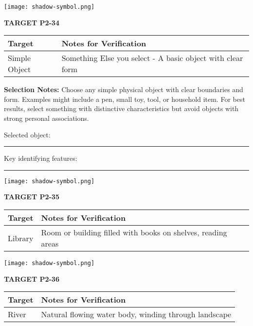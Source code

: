 \documentclass[10pt,twoside,final]{book} %
\makeatletter
\newcommand{\cleardoublepageWithSymbol}{%
  \clearpage %
  \if@twoside %
    \ifodd\c@page %
    \else %
      \thispagestyle{fancy} %
      \begingroup %
        \vspace*{0pt} %
        \vfill %
        \centering %
        \noindent 
        \texttt{[image: shadow-symbol.png]}
        \vfill %
      \endgroup
      \newpage    %
      \if@twocolumn\if@firstcolumn\else\hbox{}\newpage\fi\fi
    \fi
  \fi
}
\makeatother
\begin{document}
\cleardoublepageWithSymbol
\label{target:P2-34}
\begin{center}
\Large\textbf{TARGET P2-34}
\end{center}
\begin{mdframed}[backgroundcolor=white, linewidth=0.7pt, linecolor=rvprimary, shadow=true, shadowsize=1pt, shadowcolor=graydark!40, roundcorner=3pt]
\begin{tabular}{|p{3.5cm}|p{9cm}|}
\hline
\rowcolor{rvprimary!15}
\textbf{Target} & \textbf{Notes for Verification} \\
\hline
Simple Object & Something Else you select - A basic object with clear form \\
\hline
\end{tabular}

\vspace{0.3cm}
\textbf{Selection Notes:} Choose any simple physical object with clear boundaries and form. Examples might include a pen, small toy, tool, or household item. For best results, select something with distinctive characteristics but avoid objects with strong personal associations.

\vspace{0.2cm}
Selected object: \rule{4in}{0.4pt}

\vspace{0.2cm}
Key identifying features: \rule{4in}{0.4pt}
\end{mdframed}


\cleardoublepageWithSymbol
\label{target:P2-35}
\begin{center}
\Large\textbf{TARGET P2-35}
\end{center}
\begin{mdframed}[backgroundcolor=white, linewidth=0.7pt, linecolor=rvprimary, shadow=true, shadowsize=1pt, shadowcolor=graydark!40, roundcorner=3pt]
\begin{tabular}{|p{3.5cm}|p{9cm}|}
\hline
\rowcolor{rvprimary!15}
\textbf{Target} & \textbf{Notes for Verification} \\
\hline
Library & Room or building filled with books on shelves, reading areas \\
\hline
\end{tabular}
\end{mdframed}


\cleardoublepageWithSymbol
\label{target:P2-36}
\begin{center}
\Large\textbf{TARGET P2-36}
\end{center}
\begin{mdframed}[backgroundcolor=white, linewidth=0.7pt, linecolor=rvprimary, shadow=true, shadowsize=1pt, shadowcolor=graydark!40, roundcorner=3pt]
\begin{tabular}{|p{3.5cm}|p{9cm}|}
\hline
\rowcolor{rvprimary!15}
\textbf{Target} & \textbf{Notes for Verification} \\
\hline
River & Natural flowing water body, winding through landscape \\
\hline
\end{tabular}
\end{mdframed}
\end{document}

